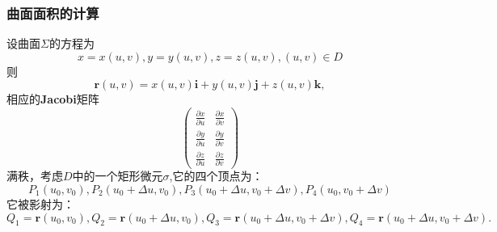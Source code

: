 \documentclass[a4paper,12pt]{article}
\begin{document}
\begin{CJK}{UTF8}{gbsn}
    \subsubsection{曲面面积的计算}
    设曲面$\Sigma$的方程为 
    \[
        x = x(u,v), y = y(u,v), z = z(u,v), (u,v) \in D 
    \]
    则
    \[
        \bm{r}(u,v) = x(u,v)\bm{i} + y(u,v)\bm{j} + z(u,v)\bm{k},
        \]
    相应的\textbf{Jacobi}矩阵
    \[
        \left( \begin{array}{cc} \frac{\partial x}{\partial u} & \frac{\partial x}{\partial v} \\
            \frac{\partial y}{\partial u} & \frac{\partial y}{\partial v} \\
            \frac{\partial z}{\partial u} & \frac{\partial z}{\partial v} 
        \end{array} \right)
    \]
    满秩，考虑$D$中的一个矩形微元$\sigma$,它的四个顶点为：
    \[
        P_1(u_0,v_0), P_2(u_0+\Delta u, v_0), P_3(u_0+\Delta u, v_0 + \Delta v), P_4(u_0, v_0+\Delta v)
        \]
    它被影射为：
    \[
        Q_1 = \bm{r}(u_0,v_0),
        Q_2 = \bm{r}(u_0+\Delta u, v_0),
        Q_3 = \bm{r}(u_0+\Delta u, v_0 + \Delta v),
        Q_4 = \bm{r}(u_0+\Delta u, v_0 + \Delta v).
        \]


\end{CJK}
\end{document}
